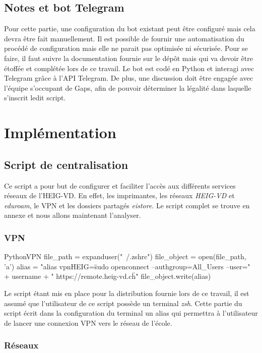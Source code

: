 \subsection{Notes et bot Telegram}
Pour cette partie, une configuration du bot existant \cite{bot} peut être configuré mais cela devra être fait manuellement.
Il est possible de fournir une automatisation du procédé de configuration mais elle ne parait pas optimisée ni sécurisée.
Pour se faire, il faut suivre la documentation fournie sur le dépôt mais qui va devoir être étoffée et complétée lors de ce travail.
Le bot est codé en Python et interagi avec Telegram grâce à l'API Telegram.
De plus, une discussion doit être engagée avec l'équipe s'occupant de Gaps, afin de pouvoir déterminer la légalité dans laquelle s'inscrit ledit script.

\section{Implémentation}

\subsection{Script de centralisation}
Ce script a pour but de configurer et faciliter l'accès aux différents services réseaux de l'HEIG-VD.
En effet, les imprimantes, les réseaux \textit{HEIG-VD} et \textit{eduroam}, le VPN et les dossiers partagés \textit{eistore}.
Le script complet se trouve en annexe et nous allons maintenant l'analyser.

\subsubsection{VPN}

\begin{listingsbox}{Python}{VPN}
file_path = expanduser("~/.zshrc")
file_object = open(file_path, 'a')
alias = "alias vpnHEIG=\"sudo openconnect --authgroup=All_Users --user=" +
username + " https://remote.heig-vd.ch\" \n"
file_object.write(alias)
\end{listingsbox}

Le script étant mis en place pour la distribution fournie lors de ce travail, il est assumé que l'utilisateur de ce script possède un terminal \textit{zsh}.
Cette partie du script écrit dans la configuration du terminal un alias qui permettra à l'utilisateur de lancer une connexion VPN vers le réseau de l'école.

\subsubsection{Réseaux}

